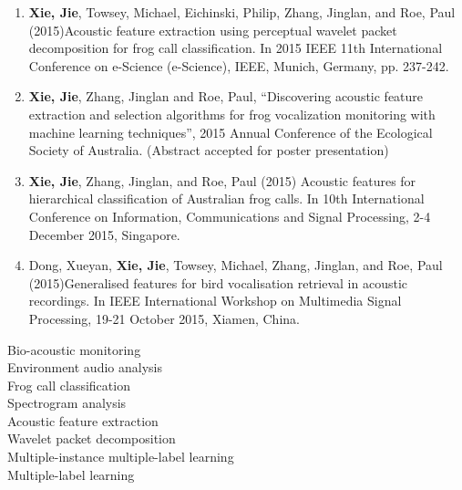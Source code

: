 \begin{enumerate}
\item	\textbf{Xie, Jie}, Towsey, Michael, Eichinski, Philip, Zhang, Jinglan, and Roe, Paul (2015)Acoustic feature extraction using perceptual wavelet packet decomposition for frog call classification. In 2015 IEEE 11th International Conference on e-Science (e-Science), IEEE, Munich, Germany, pp. 237-242.

\item	\textbf{Xie, Jie}, Zhang, Jinglan and Roe, Paul,  “Discovering acoustic feature extraction and selection algorithms for frog vocalization monitoring with machine learning techniques”, 2015 Annual Conference of the Ecological Society of Australia. (Abstract accepted for poster presentation) 

\item	\textbf{Xie, Jie}, Zhang, Jinglan, and Roe, Paul (2015) Acoustic features for hierarchical classification of Australian frog calls. In 10th International Conference on Information, Communications and Signal Processing, 2-4 December 2015, Singapore.

\item	Dong, Xueyan, \textbf{Xie, Jie}, Towsey, Michael, Zhang, Jinglan, and Roe, Paul (2015)Generalised features for bird vocalisation retrieval in acoustic recordings. In IEEE International Workshop on Multimedia Signal Processing, 19-21 October 2015, Xiamen, China.

\end{enumerate} 



\begin{keywords}
Bio-acoustic monitoring \\
Environment audio analysis \\
Frog call classification \\
Spectrogram analysis \\
Acoustic feature extraction \\
Wavelet packet decomposition \\
Multiple-instance multiple-label learning \\
Multiple-label learning \\
 
\end{keywords}

